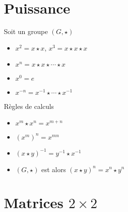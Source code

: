 \section{Puissance}

\begin{frame}
Soit un groupe $(G,\star)$
\begin{itemize}
  \item $x^2 = x \star x$, \quad  $x^3 = x\star x \star x$
  \item $x^{n} = x\star x \star \cdots \star x$
  \item $x^0 = e$
  \item $x^{-n} = x^{-1}\star \cdots \star x^{-1}$
\end{itemize}

\pause
\bigskip

Règles de calculs 
\begin{itemize}
  \item $x^m \star x^n = x^{m+n}$
  \item $(x^m)^n = x^{mn}$
  \item $(x \star y)^{-1} = y^{-1} \star x^{-1}$ \  
  \item {} $(G,\star)$ est  alors $(x\star y)^n = x^n \star y^n$
\end{itemize}  
\end{frame}



\section*{Matrices $2\times 2$}

